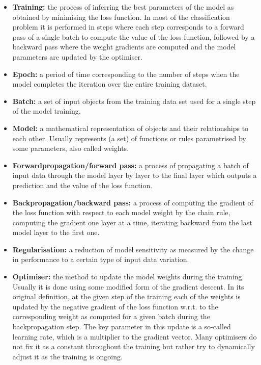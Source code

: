 \begin{itemize}
    \item[] \textbf{Training:} the process of inferring the best parameters of the model as obtained by minimising the loss function. In most of the classification problem it is performed in steps where each step corresponds to a forward pass of a single batch to compute the value of the loss function, followed by a backward pass where the weight gradients are computed and the model parameters are updated by the optimiser. 

    \item[] \textbf{Epoch:} a period of time corresponding to the number of steps when the model completes the iteration over the entire training dataset.  

    \item[] \textbf{Batch:} a set of input objects from the training data set used for a single step of the model training.

    \item[] \textbf{Model:} a mathematical representation of objects and their relationships to each other. Usually represents (a set) of functions or rules parametrised by some parameters, also called weights.

    \item[] \textbf{Forwardpropagation/forward pass:}  a process of propagating a batch of input data through the model layer by layer to the final layer which outputs a prediction and the value of the loss function.
    
    \item[] \textbf{Backpropagation/backward pass:} a process of computing the gradient of the loss function with respect to each model weight by the chain rule, computing the gradient one layer at a time, iterating backward from the last model layer to the first one. 
 
    \item[] \textbf{Regularisation:} a reduction of model sensitivity as measured by the change in performance to a certain type of input data variation.

    \item[] \textbf{Optimiser:} the method to update the model weights during the training. Usually it is done using some modified form of the gradient descent. In its original definition, at the given step of the training each of the weights is updated by the negative gradient of the loss function w.r.t. to the corresponding weight as computed for a given batch during the backpropagation step. The key parameter in this update is a so-called learning rate, which is a multiplier to the gradient vector. Many optimisers do not fix it as a constant throughout the training but rather try to dynamically adjust it as the training is ongoing.


\end{itemize}
